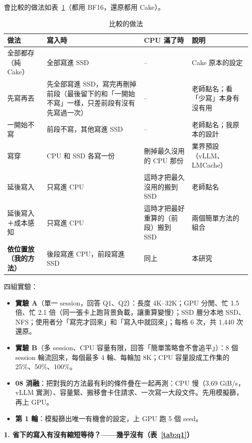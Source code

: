\documentclass[11pt,a4paper]{article}
\newcommand{\subsect}[1]{\vspace{4pt}{\bfseries #1}\par}
\begin{document}
\subsect{（一）實驗設計}
會比較的做法如表~\ref{tab:strat}（都用 BF16，還原都用 Cake）。

\begin{table}[h]
\centering
\caption{比較的做法}\label{tab:strat}
\small
\begin{tabularx}{\linewidth}{l >{\raggedright\arraybackslash}X >{\raggedright\arraybackslash}X l}
\toprule
做法 & 寫入時 & CPU 滿了時 & 說明 \\
\midrule
全部都存（純 Cake） & 全部寫進 SSD & -- & Cake 原本的設定 \\
先寫再丟 & 先全部寫進 SSD，寫完再刪掉前段（最後留下的和「一開始不寫」一樣，只差前段有沒有先寫過一次） & -- & 老師點名；看「少寫」本身有沒有用 \\
一開始不寫 & 前段不寫，其他寫進 SSD & -- & 老師點名；我原本的設計 \\
寫穿 & CPU 和 SSD 各寫一份 & 刪掉最久沒用的 CPU 那份 & 業界預設（vLLM、LMCache） \\
延後寫入 & 只寫進 CPU & 這時才把最久沒用的搬到 SSD & 老師點名 \\
延後寫入＋成本感知 & 只寫進 CPU & 這時才把最好重算的（前段）搬到 SSD & 兩個簡單方法的組合 \\
\textbf{依位置放（我的方法）} & 後段寫進 CPU，前段寫進 SSD & 同上 & 本研究 \\
\bottomrule
\end{tabularx}
\end{table}

四組實驗：
\begin{itemize}
\item \textbf{實驗 A}（單一 session，回答 Q1、Q2）：長度 4K--32K；GPU 分閒、忙 1.5 倍、忙 2.1 倍（同一張卡上跑背景負載，讓重算變慢）；SSD 層分本地 SSD、NFS；使用者分「寫完才回來」和「寫入中就回來」；每格 6 次，共 1,440 次還原。
\item \textbf{實驗 B}（多 session、CPU 容量有限，回答「簡單策略會不會追平」）：8 個 session 輪流回來，每個最多 4 輪、每輪加 8K；CPU 容量設成工作集的 25\%、50\%、100\%。
\item \textbf{08 消融}：把對我的方法最有利的條件疊在一起再測：CPU 慢（3.69 GiB/s，vLLM 實測）、容量緊、搬移會卡住請求、一次寫一大段文件。先用模擬篩，再上 GPU。
\item \textbf{第 1 輪}：模擬篩出唯一有機會的設定，上 GPU 跑 5 個 seed。
\end{itemize}

\subsect{（二）結果}

\textbf{1. 省下的寫入有沒有縮短等待？——幾乎沒有（表~\ref{tab:q1}）}
\end{document}
